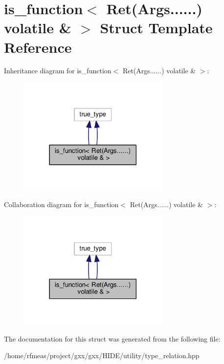 \hypertarget{structis__function_3_01Ret_07Args_8_8_8_8_8_8_08_01volatile_01_6_01_4}{}\section{is\+\_\+function$<$ Ret(Args......) volatile \& $>$ Struct Template Reference}
\label{structis__function_3_01Ret_07Args_8_8_8_8_8_8_08_01volatile_01_6_01_4}


Inheritance diagram for is\+\_\+function$<$ Ret(Args......) volatile \& $>$\+:
\nopagebreak
\begin{figure}[H]
\begin{center}
\leavevmode
\includegraphics[width=213pt]{structis__function_3_01Ret_07Args_8_8_8_8_8_8_08_01volatile_01_6_01_4__inherit__graph}
\end{center}
\end{figure}


Collaboration diagram for is\+\_\+function$<$ Ret(Args......) volatile \& $>$\+:
\nopagebreak
\begin{figure}[H]
\begin{center}
\leavevmode
\includegraphics[width=213pt]{structis__function_3_01Ret_07Args_8_8_8_8_8_8_08_01volatile_01_6_01_4__coll__graph}
\end{center}
\end{figure}


The documentation for this struct was generated from the following file\+:\begin{DoxyCompactItemize}
\item 
/home/rfmeas/project/gxx/gxx/\+H\+I\+D\+E/utility/type\+\_\+relation.\+hpp\end{DoxyCompactItemize}
